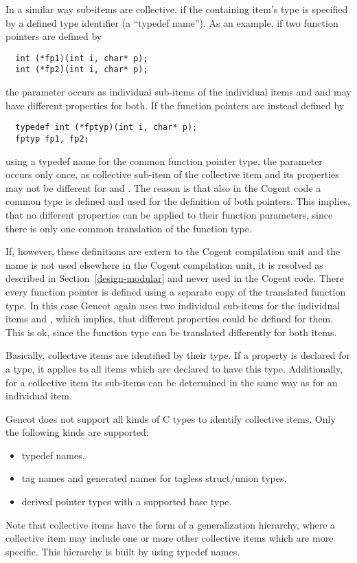 In a similar way sub-items are collective, if the containing item's type is specified by a defined type identifier
(a ``typedef name''). As an example, if two function pointers are defined by
\begin{verbatim}
  int (*fp1)(int i, char* p);
  int (*fp2)(int i, char* p);
\end{verbatim}
the parameter  occurs as individual sub-items of the individual items  and 
and may have different properties for both. If the function pointers are instead defined by
\begin{verbatim}
  typedef int (*fptyp)(int i, char* p);
  fptyp fp1, fp2;
\end{verbatim}
using a typedef name for the common function pointer type, the parameter  occurs only once, as collective sub-item of
the collective item  and its properties may not be different for  and .
The reason is that also in the Cogent code a common type is defined and used for the definition of both pointers. This implies,
that no different properties can be applied to their function parameters, since there is only one common translation of the 
function type.

If, however, these definitions are extern to the Cogent compilation unit and the name  is not used elsewhere
in the Cogent compilation unit, it is resolved as described in Section~\ref{design-modular} and never used in the Cogent code. 
There every function pointer is defined using a separate copy of the translated function type. In this case
Gencot again uses two individual sub-items  for the individual items  and , which implies, that different
properties could be defined for them. This is ok, since the function type can be translated differently for both
items.

Basically, collective items are identified by their type. If a property is declared for a type, it applies to 
all items which are declared to have this type. Additionally, for a collective item its sub-items can be determined
in the same way as for an individual item. 

Gencot does not support all kinds of C types to identify collective items. Only the following kinds are supported:
\begin{itemize}
\item typedef names,
\item tag names and generated names for tagless struct/union types,
\item derived pointer types with a supported base type.
\end{itemize}
Note that collective items have the form of a generalization hierarchy, where a collective item may include one or 
more other collective items which are more specific. This hierarchy is built by using typedef names.

